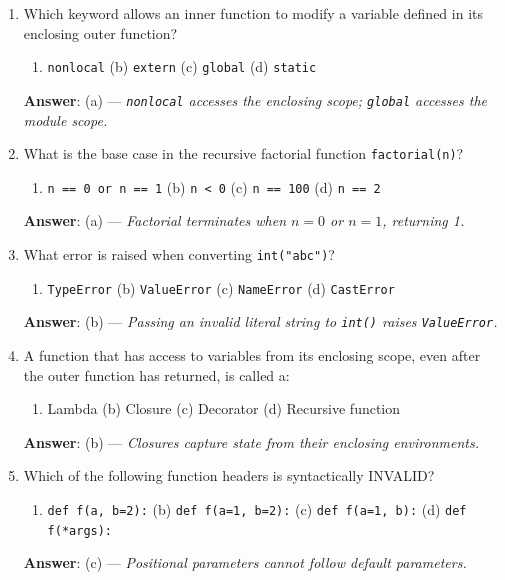 \begin{enumerate}[leftmargin=1.5em]
    \item Which keyword allows an inner function to modify a variable defined in its enclosing outer function?
    \begin{enumerate}[label=(\alph*)]
        \item \texttt{nonlocal} \quad (b) \texttt{extern} \quad (c) \texttt{global} \quad (d) \texttt{static}
    \end{enumerate}
    \textbf{Answer}: (a) --- \textit{\texttt{nonlocal} accesses the enclosing scope; \texttt{global} accesses the module scope.}

    \item What is the base case in the recursive factorial function \texttt{factorial(n)}?
    \begin{enumerate}[label=(\alph*)]
        \item \texttt{n == 0 or n == 1} \quad (b) \texttt{n < 0} \quad (c) \texttt{n == 100} \quad (d) \texttt{n == 2}
    \end{enumerate}
    \textbf{Answer}: (a) --- \textit{Factorial terminates when $n=0$ or $n=1$, returning 1.}

    \item What error is raised when converting \texttt{int("abc")}?
    \begin{enumerate}[label=(\alph*)]
        \item \texttt{TypeError} \quad (b) \texttt{ValueError} \quad (c) \texttt{NameError} \quad (d) \texttt{CastError}
    \end{enumerate}
    \textbf{Answer}: (b) --- \textit{Passing an invalid literal string to \texttt{int()} raises \texttt{ValueError}.}

    \item A function that has access to variables from its enclosing scope, even after the outer function has returned, is called a:
    \begin{enumerate}[label=(\alph*)]
        \item Lambda \quad (b) Closure \quad (c) Decorator \quad (d) Recursive function
    \end{enumerate}
    \textbf{Answer}: (b) --- \textit{Closures capture state from their enclosing environments.}

    \item Which of the following function headers is syntactically INVALID?
    \begin{enumerate}[label=(\alph*)]
        \item \texttt{def f(a, b=2):} \quad (b) \texttt{def f(a=1, b=2):} \quad (c) \texttt{def f(a=1, b):} \quad (d) \texttt{def f(*args):}
    \end{enumerate}
    \textbf{Answer}: (c) --- \textit{Positional parameters cannot follow default parameters.}


\end{enumerate}
